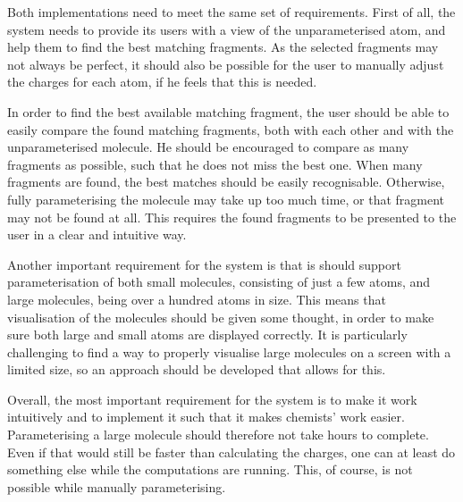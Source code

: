 Both implementations need to meet the same set of requirements. First of all, the system needs to provide its users with a view of the unparameterised atom, and help them to find the best matching fragments. As the selected fragments may not always be perfect, it should also be possible for the user to manually adjust the charges for each atom, if he feels that this is needed.

In order to find the best available matching fragment, the user should be able to easily compare the found matching fragments, both with each other and with the unparameterised molecule. He should be encouraged to compare as many fragments as possible, such that he does not miss the best one. When many fragments are found, the best matches should be easily recognisable. Otherwise, fully parameterising the molecule may take up too much time, or that fragment may not be found at all. This requires the found fragments to be presented to the user in a clear and intuitive way.

Another important requirement for the system is that is should support parameterisation of both small molecules, consisting of just a few atoms, and large molecules, being over a hundred atoms in size. This means that visualisation of the molecules should be given some thought, in order to make sure both large and small atoms are displayed correctly. It is particularly challenging to find a way to properly visualise large molecules on a screen with a limited size, so an approach should be developed that allows for this.

Overall, the most important requirement for the system is to make it work intuitively and to implement it such that it makes chemists' work easier. Parameterising a large molecule should therefore not take hours to complete. Even if that would still be faster than calculating the charges, one can at least do something else while the computations are running. This, of course, is not possible while manually parameterising.
